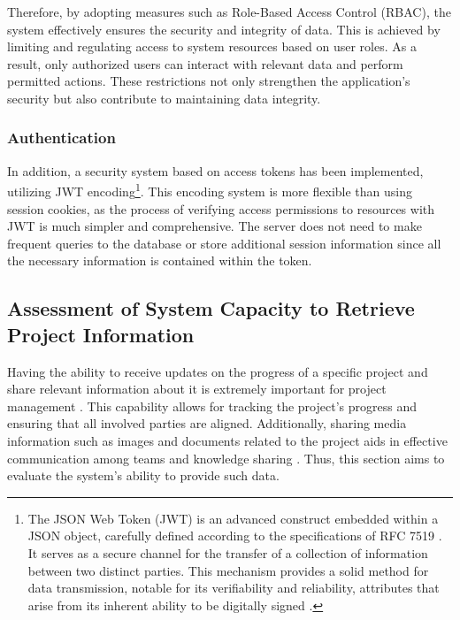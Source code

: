 Therefore, by adopting measures such as Role-Based Access Control (RBAC), the system effectively ensures the security and integrity of data. This is achieved by limiting and regulating access to system resources based on user roles. As a result, only authorized users can interact with relevant data and perform permitted actions. These restrictions not only strengthen the application's security but also contribute to maintaining data integrity.

\subsubsection{Authentication}

In addition, a security system based on access tokens has been implemented, utilizing JWT encoding\footnote{The JSON Web Token (JWT) is an advanced construct embedded within a JSON object, carefully defined according to the specifications of RFC 7519 \cite{johns_2016}. It serves as a secure channel for the transfer of a collection of information between two distinct parties. This mechanism provides a solid method for data transmission, notable for its verifiability and reliability, attributes that arise from its inherent ability to be digitally signed \cite{Ahmed9022766}.}. This encoding system is more flexible than using session cookies, as the process of verifying access permissions to resources with JWT is much simpler and comprehensive. The server does not need to make frequent queries to the database or store additional session information since all the necessary information is contained within the token.


\subsection{Assessment of System Capacity to Retrieve Project Information}

Having the ability to receive updates on the progress of a specific project and share relevant information about it is extremely important for project management \cite{lamptey2012developing}. This capability allows for tracking the project's progress and ensuring that all involved parties are aligned. Additionally, sharing media information such as images and documents related to the project aids in effective communication among teams and knowledge sharing \cite{Ihab}. Thus, this section aims to evaluate the system's ability to provide such data.

